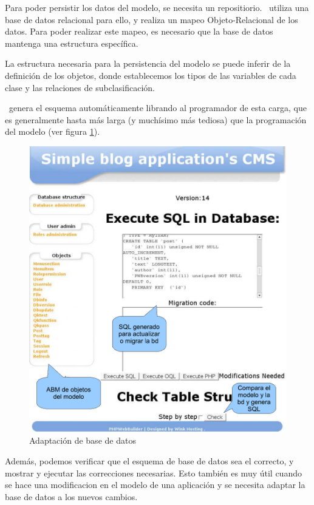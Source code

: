 Para poder persistir los datos del modelo, se necesita un repositiorio. \PWB\ utiliza una base de datos relacional para ello, y realiza un mapeo Objeto-Relacional de los datos. Para poder realizar este mapeo, es necesario que la base de datos mantenga una estructura específica.

La estructura necesaria para la persistencia del modelo se puede inferir de la definición de los objetos, donde establecemos los tipos de las variables de cada clase y las relaciones de subclasificación.

\PWB \ genera el esquema automáticamente librando al programador de esta carga, que es generalmente hasta más larga (y muchísimo más tediosa) que la programación del modelo (ver figura \ref{fig-admin1}).

\begin{figure}[h]
	\centering
	\includegraphics[scale=0.5]{images/admin2.pdf}
 	\caption{Adaptación de base de datos}
 	\label{fig-admin1}
\end{figure}

Además, podemos verificar que el esquema de base de datos sea el correcto, y mostrar y ejecutar las correcciones necesarias. Esto también es muy útil cuando se hace una modificacion en el modelo de una aplicación y se necesita adaptar la base de datos a los nuevos cambios.


